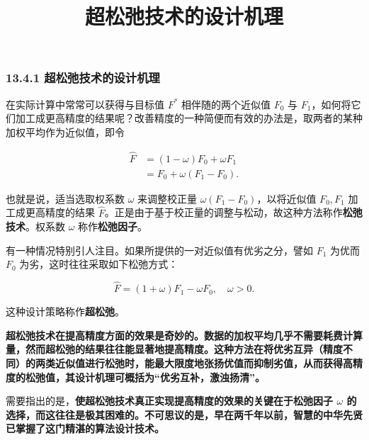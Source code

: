 \documentclass[
  10pt,
  fontset=fandol]{ctexart}
\title{超松弛技术的设计机理}
\author{}
\date{}
\begin{document}
\maketitle

\subsubsection{13.4.1 超松弛技术的设计机理}\label{ux8d85ux677eux5f1bux6280ux672fux7684ux8bbeux8ba1ux673aux7406}

在实际计算中常常可以获得与目标值 \(F^*\) 相伴随的两个近似值 \(F_0\) 与 \(F_1\)，如何将它们加工成更高精度的结果呢？改善精度的一种简便而有效的办法是，取两者的某种加权平均作为近似值，即令

\[
\begin{aligned}
\widehat F&=(1-\omega)F_0+\omega F_1\\
&=F_0+\omega(F_1-F_0).
\end{aligned}
\]

也就是说，适当选取权系数 \(\omega\) 来调整校正量 \(\omega(F_1-F_0)\)，以将近似值 \(F_0,F_1\) 加工成更高精度的结果 \(\widehat F\)。正是由于基于校正量的调整与松动，故这种方法称作\textbf{松弛技术}。权系数 \(\omega\) 称作\textbf{松弛因子}。

有一种情况特别引人注目。如果所提供的一对近似值有优劣之分，譬如 \(F_1\) 为优而 \(F_0\) 为劣，这时往往采取如下松弛方式：

\[
\widehat F=(1+\omega)F_1-\omega F_0,\quad\omega>0.
\]

这种设计策略称作\textbf{超松弛}。

\textbf{超松弛技术在提高精度方面的效果是奇妙的。数据的加权平均几乎不需要耗费计算量，然而超松弛的结果往往能显著地提高精度。这种方法在将优劣互异（精度不同）的两类近似值进行松弛时，能最大限度地张扬优值而抑制劣值，从而获得高精度的松弛值，其设计机理可概括为``优劣互补，激浊扬清''。}

需要指出的是，\textbf{使超松弛技术真正实现提高精度的效果的关键在于松弛因子 \(\omega\) 的选择，而这往往是极其困难的。不可思议的是，早在两千年以前，智慧的中华先贤已掌握了这门精湛的算法设计技术。}
\end{document}
